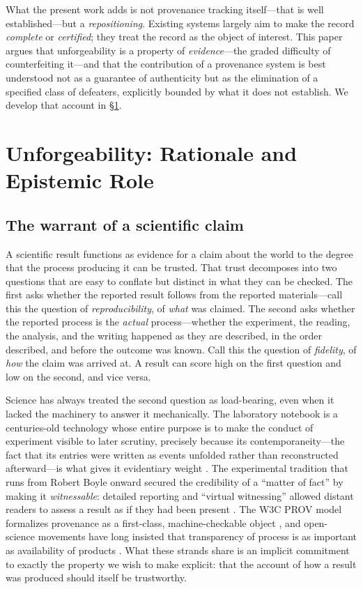 \documentclass[11pt]{article}
\begin{document}
What the present work adds is not provenance tracking itself---that is well
established---but a \emph{repositioning}. Existing systems largely aim to make the
record \emph{complete} or \emph{certified}; they treat the record as the object of
interest. This paper argues that unforgeability is a property of \emph{evidence}---the
graded difficulty of counterfeiting it---and that the contribution of a provenance
system is best understood not as a guarantee of authenticity but as the elimination of
a specified class of defeaters, explicitly bounded by what it does not establish. We
develop that account in \S\ref{sec:rationale}.

\section{Unforgeability: Rationale and Epistemic Role}
\label{sec:rationale}

\subsection{The warrant of a scientific claim}

A scientific result functions as evidence for a claim about the world to the degree that
the process producing it can be trusted. That trust decomposes into two questions that
are easy to conflate but distinct in what they can be checked. The first asks whether
the reported result follows from the reported materials---call this the question of
\emph{reproducibility}, of \emph{what} was claimed. The second asks whether the reported
process is the \emph{actual} process---whether the experiment, the reading, the analysis,
and the writing happened as they are described, in the order described, and before the
outcome was known. Call this the question of \emph{fidelity}, of \emph{how} the claim
was arrived at. A result can score high on the first question and low on the second, and
vice versa.

Science has always treated the second question as load-bearing, even when it lacked the
machinery to answer it mechanically. The laboratory notebook is a centuries-old
technology whose entire purpose is to make the conduct of experiment visible to later
scrutiny, precisely because its contemporaneity---the fact that its entries were written
as events unfolded rather than reconstructed afterward---is what gives it evidentiary
weight \parencite{macrina2014}. The experimental tradition that runs from Robert Boyle
onward secured the credibility of a ``matter of fact'' by making it \emph{witnessable}:
detailed reporting and ``virtual witnessing'' allowed distant readers to assess a result
as if they had been present \parencite{shapin1985}. The W3C \textsc{PROV} model formalizes
provenance as a first-class, machine-checkable object \parencite{w3cprov2013,moreau2013,moreau2013book}, and
open-science movements have long insisted that transparency of process is as important
as availability of products \parencite{nosek2015top,fanelli2011}. What these strands share is
an implicit commitment to exactly the property we wish to make explicit: that the account
of how a result was produced should itself be trustworthy.
\end{document}
